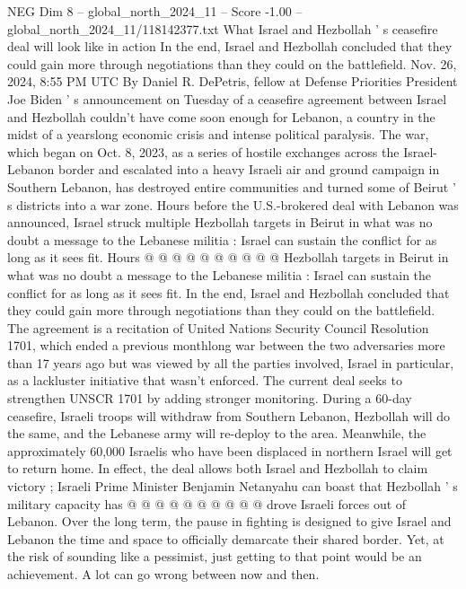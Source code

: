 \begin{textsample}{NEG Dim 8 – global\_north\_2024\_11 – Score -1.00 – global\_north\_2024\_11/118142377.txt}  \label{ex:f8_neg_392}
What Israel and Hezbollah ' s ceasefire deal will look like in action In the end, Israel and Hezbollah concluded that they could gain more through negotiations than they could on the battlefield.
Nov. 26, 2024, 8:55 PM UTC By Daniel R.
DePetris, fellow at Defense Priorities President Joe Biden ' s announcement on Tuesday of a ceasefire agreement between Israel and Hezbollah couldn't have come soon enough for Lebanon, a country in the midst of a yearslong economic crisis and intense political paralysis.
The war, which began on Oct. 8, 2023, as a series of hostile exchanges across the Israel-Lebanon border and escalated into a heavy Israeli air and ground campaign in Southern Lebanon, has destroyed entire communities and turned some of Beirut ' s districts into a war zone.
Hours before the U.S.-brokered deal with Lebanon was announced, Israel struck multiple Hezbollah targets in Beirut in what was no doubt a message to the Lebanese militia : Israel can sustain the conflict for as long as it sees fit.
Hours @ @ @ @ @ @ @ @ @ @ Hezbollah targets in Beirut in what was no doubt a message to the Lebanese militia : Israel can sustain the conflict for as long as it sees fit.
In the end, Israel and Hezbollah concluded that they could gain more through negotiations than they could on the battlefield.
The agreement is a recitation of United Nations Security Council Resolution 1701, which ended a previous monthlong war between the two adversaries more than 17 years ago but was viewed by all the parties involved, Israel in particular, as a lackluster initiative that wasn't enforced.
The current deal seeks to strengthen UNSCR 1701 by adding stronger monitoring.
During a 60-day ceasefire, Israeli troops will withdraw from Southern Lebanon, Hezbollah will do the same, and the Lebanese army will re-deploy to the area.
Meanwhile, the approximately 60,000 Israelis who have been displaced in northern Israel will get to return home.
In effect, the deal allows both Israel and Hezbollah to claim victory ; Israeli Prime Minister Benjamin Netanyahu can boast that Hezbollah ' s military capacity has @ @ @ @ @ @ @ @ @ @ drove Israeli forces out of Lebanon.
Over the long term, the pause in fighting is designed to give Israel and Lebanon the time and space to officially demarcate their shared border.
Yet, at the risk of sounding like a pessimist, just getting to that point would be an achievement.
A lot can go wrong between now and then.

\end{textsample}
